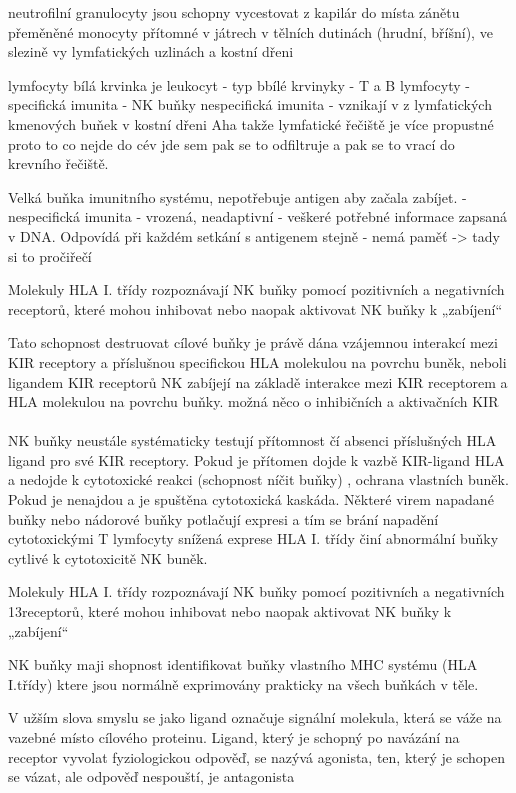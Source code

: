 \documentclass[czech,DP]{thesiskiv}
\begin{document}
neutrofilní granulocyty jsou schopny vycestovat z kapilár do místa zánětu
přeměněné monocyty přítomné v játrech v tělních dutinách (hrudní, bříšní), ve slezině vy lymfatických uzlinách a kostní dřeni

lymfocyty 
bílá krvinka je leukocyt
- typ bbílé krvinyky 
- T a B lymfocyty - specifická imunita
- NK buňky nespecifická imunita
- vznikají v z lymfatických kmenových buňek v kostní dřeni
Aha takže lymfatické řečiště je více propustné proto to co nejde do cév jde sem pak se to odfiltruje a pak se to vrací do krevního řečiště.

Velká buňka imunitního systému, nepotřebuje antigen aby začala zabíjet. 
-nespecifická imunita - vrozená, neadaptivní - veškeré potřebné informace zapsaná v DNA. Odpovídá při každém setkání s antigenem stejně - nemá paměť -> tady si to pročiřečí

Molekuly HLA I. třídy rozpoznávají NK buňky pomocí pozitivních a negativních receptorů, které mohou inhibovat nebo naopak aktivovat NK buňky k „zabíjení“

Tato schopnost destruovat cílové buňky je právě dána vzájemnou
interakcí mezi KIR receptory a příslušnou specifickou HLA molekulou
na povrchu buněk, neboli ligandem KIR receptorů
NK zabíjejí na základě interakce mezi KIR receptorem a HLA molekulou na povrchu buňky.
možná něco o inhibičních a aktivačních KIR 
\\
\\
NK buňky neustále systématicky testují přítomnost čí absenci příslušných HLA ligand pro své KIR receptory. Pokud je přítomen dojde k vazbě KIR-ligand HLA a nedojde k cytotoxické reakci (schopnost níčit buňky) , ochrana vlastních buněk. Pokud je 
nenajdou a je spuštěna cytotoxická kaskáda.
Některé virem napadané buňky nebo nádorové buňky potlačují expresi a tím se brání napadění cytotoxickými T lymfocyty
snížená exprese HLA I. třídy činí abnormální buňky cytlivé k cytotoxicitě NK buněk.

 Molekuly HLA I. třídy rozpoznávají NK buňky pomocí pozitivních a negativních
13receptorů, které mohou inhibovat nebo naopak aktivovat NK buňky k „zabíjení“

NK buňky maji shopnost identifikovat buňky vlastního MHC systému (HLA I.třídy) ktere jsou normálně exprimovány prakticky na všech buňkách v těle. 

V užším slova smyslu se jako ligand označuje signální molekula, která se váže na vazebné místo cílového proteinu. Ligand, který je schopný po navázání na receptor vyvolat fyziologickou odpověď, se nazývá agonista, ten, který je schopen se vázat, ale odpověď nespouští, je antagonista
\end{document}
